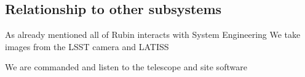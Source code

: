 \subsection{Relationship to other subsystems}

As already mentioned all of Rubin interacts with System Engineering
   We take images from the  LSST camera \citep{2010SPIE.7735E..0JK} and LATISS \citep{2020SPIE11452E..0UI}

   We are commanded and listen to the telescope  and site software  \citep{2022SPIE12182E..0WT}
